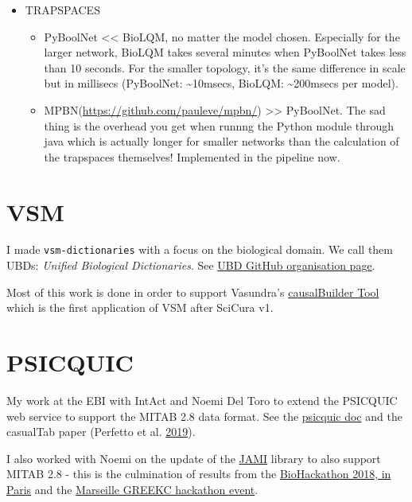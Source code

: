 \documentclass[
  12pt,
]{book}
\providecommand{\tightlist}{%
  \setlength{\itemsep}{0pt}\setlength{\parskip}{0pt}}
\begin{document}
\begin{itemize}
\tightlist
\item
  TRAPSPACES

  \begin{itemize}
  \tightlist
  \item
    PyBoolNet \textless\textless{} BioLQM, no matter the model chosen. Especially for the larger network, BioLQM takes several minutes when PyBoolNet takes less than 10 seconds. For the smaller topology, it's the same difference in scale but in millisecs (PyBoolNet: \textasciitilde10msecs, BioLQM: \textasciitilde200msecs per model).
  \item
    MPBN(\url{https://github.com/pauleve/mpbn/}) \textgreater\textgreater{} PyBoolNet.
    The sad thing is the overhead you get when runnng the Python module through java which is actually longer for smaller networks than the calculation of the trapspaces themselves! Implemented in the pipeline now.
  \end{itemize}
\end{itemize}

\hypertarget{vsm}{%
\section*{VSM}\label{vsm}}

I made \texttt{vsm-dictionaries} with a focus on the biological domain.
We call them UBDs: \emph{Unified Biological Dictionaries}.
See \href{https://github.com/UniBioDicts}{UBD GitHub organisation page}.

Most of this work is done in order to support Vasundra's \href{https://mi2cast.github.io/causalBuilder/}{causalBuilder Tool} which is the first application of VSM after SciCura v1.

\hypertarget{psicquic}{%
\section*{PSICQUIC}\label{psicquic}}

My work at the EBI with IntAct and Noemi Del Toro to extend the PSICQUIC web service to support the
MITAB 2.8 data format.
See the \href{http://psicquic.github.io/MITAB28Format.html}{psicquic doc} and the casualTab paper (Perfetto et al. \protect\hyperlink{ref-Perfetto2019}{2019}).

I also worked with Noemi on the update of the \href{https://github.com/MICommunity/psi-jami}{JAMI}
library to also support MITAB 2.8 - this is the culmination of results from the
\href{https://2018.biohackathon-europe.org/}{BioHackathon 2018, in Paris} and the
\href{https://github.com/GREEKC/hackathon-marseille/tree/master/project_descriptions/causal_psicquic}{Marseille GREEKC hackathon event}.
\end{document}

